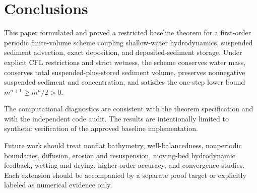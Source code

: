 \section{Conclusions}

This paper formulated and proved a restricted baseline theorem for a first-order periodic finite-volume scheme coupling shallow-water hydrodynamics, suspended sediment advection, exact deposition, and deposited-sediment storage. Under explicit CFL restrictions and strict wetness, the scheme conserves water mass, conserves total suspended-plus-stored sediment volume, preserves nonnegative suspended sediment and concentration, and satisfies the one-step lower bound \(m^{n+1}\ge m^n/2>0\).

The computational diagnostics are consistent with the theorem specification and with the independent code audit. The results are intentionally limited to synthetic verification of the approved baseline implementation.

Future work should treat nonflat bathymetry, well-balancedness, nonperiodic boundaries, diffusion, erosion and resuspension, moving-bed hydrodynamic feedback, wetting and drying, higher-order accuracy, and convergence studies. Each extension should be accompanied by a separate proof target or explicitly labeled as numerical evidence only.
